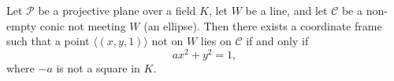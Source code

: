 Let $\mathcal{P}$ be a projective plane over a field $K$, let $W$ be a line, and let $\mathcal{C}$ be a non-empty conic not meeting $W$ (an ellipse). Then there exists a coordinate frame such that a point $\langle(x, y, 1)\rangle$ not on $W$ lies on $\mathcal{C}$ if and only if
$$a x^2 + y^2 = 1,$$
where $-a$ is not a square in $K$.
